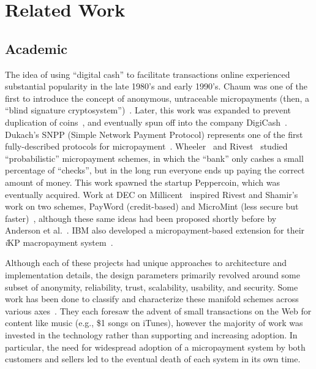 \section{Related Work}

\subsection{Academic}\label{academic_related}
The idea of using ``digital cash'' to facilitate transactions online experienced substantial popularity in the late 1980's and early 1990's.
Chaum was one of the first to introduce the concept of anonymous, untraceable micropayments (then, a ``blind signature cryptosystem'')~\cite{chaum1983blind}.
Later, this work was expanded to prevent duplication of coins~\cite{chaum1990untraceable}, and eventually spun off into the company DigiCash~\cite{schoenmakers1998security}.
Dukach's SNPP (Simple Network Payment Protocol) represents one of the first fully-described protocols for micropayment~\cite{dukach1992snpp}.
Wheeler~\cite{wheeler1997transactions} and Rivest~\cite{rivest1997electronic} studied ``probabilistic'' micropayment schemes, in which the ``bank'' only cashes a small percentage of ``checks'', but in the long run everyone ends up paying the correct amount of money.
This work spawned the startup Peppercoin, which was eventually acquired.
Work at DEC on Millicent~\cite{manasse1995millicent} inspired Rivest and Shamir's work on two schemes, PayWord (credit-based) and MicroMint (less secure but faster)~\cite{rivest1997payword}, although these same ideas had been proposed shortly before by Anderson et al.~\cite{anderson1997netcard}.
IBM also developed a micropayment-based extension for their \textit{i}KP macropayment system~\cite{hauser1996micro}.

Although each of these projects had unique approaches to architecture and implementation details, the design parameters primarily revolved around some subset of anonymity, reliability, trust, scalability, usability, and security. Some work has been done to classify and characterize these manifold schemes across various axes~\cite{abrazhevich2001classification,parhonyi2005second,parhonyi2006fall}. They each foresaw the advent of small transactions on the Web for content like music (e.g., \$1 songs on iTunes), however the majority of work was invested in the technology rather than supporting and increasing adoption. In particular, the need for widespread adoption of a micropayment system by both customers and sellers led to the eventual death of each system in its own time.

